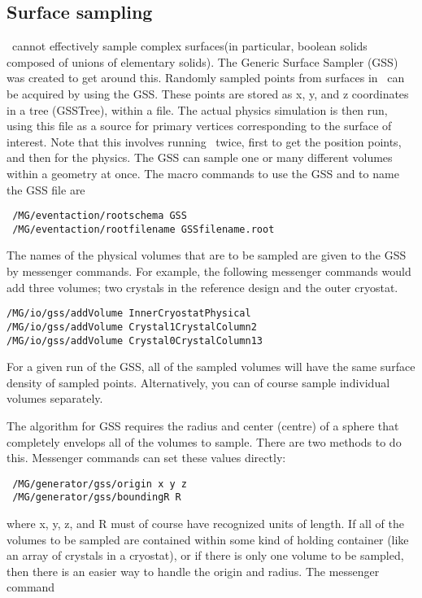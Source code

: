 \subsection{Surface sampling} 
\label{sec:surfacesampling}
\geant \ cannot effectively sample complex surfaces(in particular, boolean solids
composed of unions of elementary solids).  The Generic Surface Sampler (GSS) was
created to get around this.  Randomly sampled points from surfaces in
\mage \ can be acquired by using the GSS.  These points are stored as x, y, and z
coordinates in a \rootv tree (GSSTree),  within a \rootv file.  The actual
physics simulation
is then run, using this file as a source for primary vertices corresponding to
the surface of interest.  Note that this involves running \mage \ twice, first to
get the position points, and then for the physics.  The GSS can sample one or many different volumes within a geometry at once.  The macro commands to use the GSS and to name the GSS \rootv file are

\begin{lstlisting}
 /MG/eventaction/rootschema GSS
 /MG/eventaction/rootfilename GSSfilename.root
\end{lstlisting}

The names of the physical volumes that are to be sampled are given to the GSS by
messenger commands.  For example, the following messenger commands would add
three volumes; two crystals in the \majorana reference design and the outer
cryostat.

\begin{lstlisting}
/MG/io/gss/addVolume InnerCryostatPhysical
/MG/io/gss/addVolume Crystal1CrystalColumn2
/MG/io/gss/addVolume Crystal0CrystalColumn13
\end{lstlisting}
\noindent For a given run of the GSS, all of the sampled volumes will have the
same surface density of sampled points.  Alternatively, you can of course sample
individual volumes separately.

The algorithm for GSS requires the radius and center (centre) of a sphere that
completely envelops all of the volumes to sample.  There are two methods to do
this.  Messenger commands can set these values directly:

\begin{lstlisting}
 /MG/generator/gss/origin x y z
 /MG/generator/gss/boundingR R
\end{lstlisting}

\noindent where x, y, z, and R must of course have recognized units of length.  If all of
the volumes to be sampled are contained within some kind of holding container
(like an array of crystals in a cryostat), or if there is only one volume to be
sampled, then there is an easier way to handle the origin and radius.  The
messenger command

